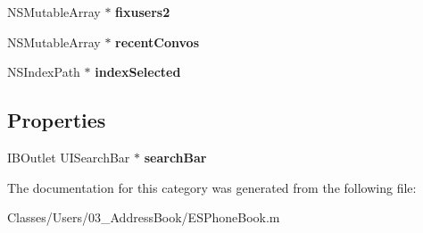\begin{DoxyCompactItemize}
\item 
\hypertarget{category_e_s_phone_book_07_08_aa290d29ec6dd80f14213286fb59b66c5}{}N\+S\+Mutable\+Array $\ast$ {\bfseries fixusers2}\label{category_e_s_phone_book_07_08_aa290d29ec6dd80f14213286fb59b66c5}

\item 
\hypertarget{category_e_s_phone_book_07_08_a5ec7122d6323141b70d71dc74283e0e1}{}N\+S\+Mutable\+Array $\ast$ {\bfseries recent\+Convos}\label{category_e_s_phone_book_07_08_a5ec7122d6323141b70d71dc74283e0e1}

\item 
\hypertarget{category_e_s_phone_book_07_08_ab7a2d6e92a1bddddd6926fe0e7c83b8b}{}N\+S\+Index\+Path $\ast$ {\bfseries index\+Selected}\label{category_e_s_phone_book_07_08_ab7a2d6e92a1bddddd6926fe0e7c83b8b}

\end{DoxyCompactItemize}
\subsection*{Properties}
\begin{DoxyCompactItemize}
\item 
\hypertarget{category_e_s_phone_book_07_08_ace6039083f7a73427781581312d2d086}{}I\+B\+Outlet U\+I\+Search\+Bar $\ast$ {\bfseries search\+Bar}\label{category_e_s_phone_book_07_08_ace6039083f7a73427781581312d2d086}

\end{DoxyCompactItemize}


The documentation for this category was generated from the following file\+:\begin{DoxyCompactItemize}
\item 
Classes/\+Users/03\+\_\+\+Address\+Book/E\+S\+Phone\+Book.\+m\end{DoxyCompactItemize}
